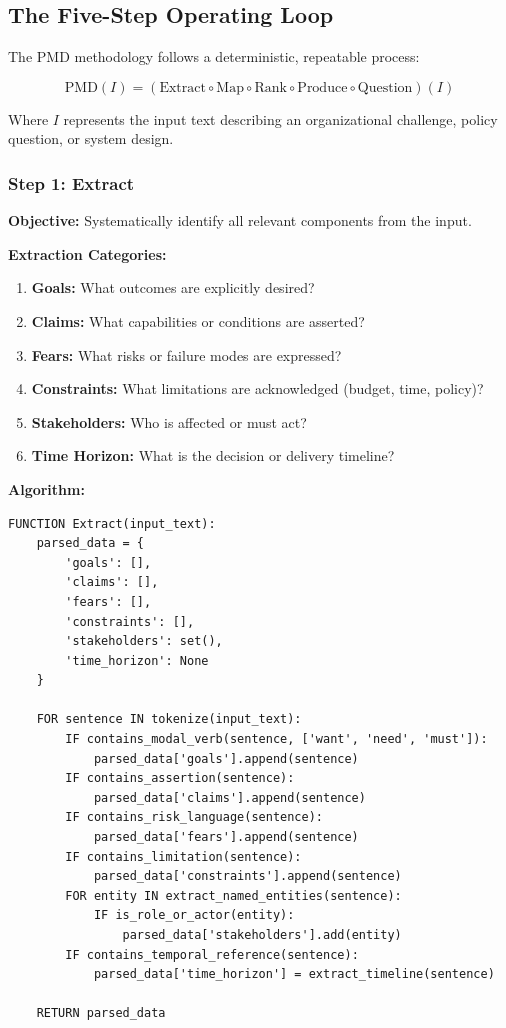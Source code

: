 \documentclass[11pt,a4paper]{article}
\begin{document}
\subsection{The Five-Step Operating Loop}

The PMD methodology follows a deterministic, repeatable process:

\begin{equation}
\text{PMD}(I) = (\text{Extract} \circ \text{Map} \circ \text{Rank} \circ \text{Produce} \circ \text{Question})(I)
\end{equation}

Where $I$ represents the input text describing an organizational challenge, policy question, or system design.

\subsubsection{Step 1: Extract}

\textbf{Objective:} Systematically identify all relevant components from the input.

\textbf{Extraction Categories:}
\begin{enumerate}
\item \textbf{Goals:} What outcomes are explicitly desired?
\item \textbf{Claims:} What capabilities or conditions are asserted?
\item \textbf{Fears:} What risks or failure modes are expressed?
\item \textbf{Constraints:} What limitations are acknowledged (budget, time, policy)?
\item \textbf{Stakeholders:} Who is affected or must act?
\item \textbf{Time Horizon:} What is the decision or delivery timeline?
\end{enumerate}

\textbf{Algorithm:}
\begin{verbatim}
FUNCTION Extract(input_text):
    parsed_data = {
        'goals': [],
        'claims': [],
        'fears': [],
        'constraints': [],
        'stakeholders': set(),
        'time_horizon': None
    }
    
    FOR sentence IN tokenize(input_text):
        IF contains_modal_verb(sentence, ['want', 'need', 'must']):
            parsed_data['goals'].append(sentence)
        IF contains_assertion(sentence):
            parsed_data['claims'].append(sentence)
        IF contains_risk_language(sentence):
            parsed_data['fears'].append(sentence)
        IF contains_limitation(sentence):
            parsed_data['constraints'].append(sentence)
        FOR entity IN extract_named_entities(sentence):
            IF is_role_or_actor(entity):
                parsed_data['stakeholders'].add(entity)
        IF contains_temporal_reference(sentence):
            parsed_data['time_horizon'] = extract_timeline(sentence)
    
    RETURN parsed_data
\end{verbatim}
\end{document}
